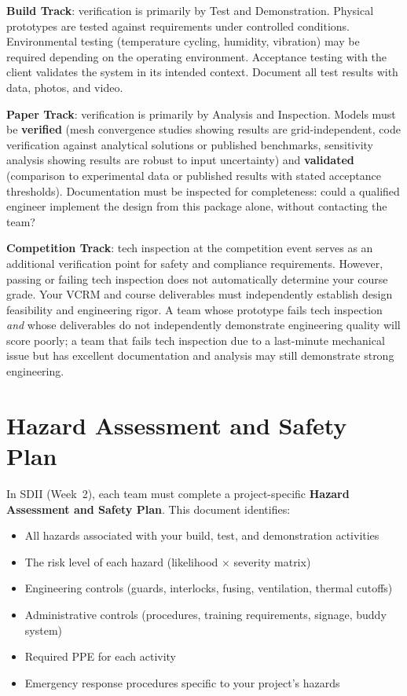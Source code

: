 \textbf{Build Track}: verification is primarily by Test and Demonstration. Physical prototypes are tested against requirements under controlled conditions. Environmental testing (temperature cycling, humidity, vibration) may be required depending on the operating environment. Acceptance testing with the client validates the system in its intended context. Document all test results with data, photos, and video.

\textbf{Paper Track}: verification is primarily by Analysis and Inspection. Models must be \textbf{verified} (mesh convergence studies showing results are grid-independent, code verification against analytical solutions or published benchmarks, sensitivity analysis showing results are robust to input uncertainty) and \textbf{validated} (comparison to experimental data or published results with stated acceptance thresholds). Documentation must be inspected for completeness: could a qualified engineer implement the design from this package alone, without contacting the team?

\textbf{Competition Track}: tech inspection at the competition event serves as an additional verification point for safety and compliance requirements. However, passing or failing tech inspection does not automatically determine your course grade. Your VCRM and course deliverables must independently establish design feasibility and engineering rigor. A team whose prototype fails tech inspection \emph{and} whose deliverables do not independently demonstrate engineering quality will score poorly; a team that fails tech inspection due to a last-minute mechanical issue but has excellent documentation and analysis may still demonstrate strong engineering.

\section{Hazard Assessment and Safety Plan}
In SDII (Week~2), each team must complete a project-specific \textbf{Hazard Assessment and Safety Plan}. This document identifies:
\begin{itemize}[nosep,leftmargin=1.5em]
\item All hazards associated with your build, test, and demonstration activities
\item The risk level of each hazard (likelihood $\times$ severity matrix)
\item Engineering controls (guards, interlocks, fusing, ventilation, thermal cutoffs)
\item Administrative controls (procedures, training requirements, signage, buddy system)
\item Required PPE for each activity
\item Emergency response procedures specific to your project's hazards
\end{itemize}

